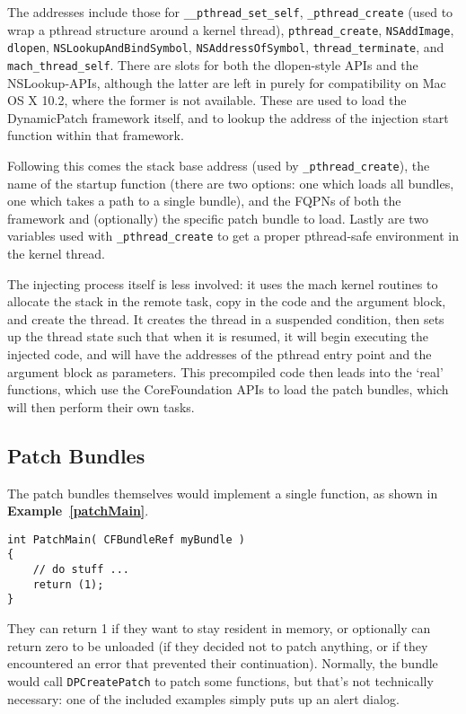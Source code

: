 \documentclass[english]{article}
\begin{document}
The addresses include those for \texttt{\_\_pthread\_set\_self}, \texttt{\_pthread\_create} (used to wrap a pthread structure around a kernel thread), \texttt{pthread\_create}, \texttt{NSAddImage}, \texttt{dlopen}, \texttt{NSLookupAndBindSymbol}, \texttt{NSAddressOfSymbol}, \texttt{thread\_terminate}, and \texttt{mach\_thread\_self}. There are slots for both the dlopen-style APIs and the NSLookup-APIs, although the latter are left in purely for compatibility on Mac OS X 10.2, where the former is not available. These are used to load the DynamicPatch framework itself, and to lookup the address of the injection start function within that framework.

Following this comes the stack base address (used by \texttt{\_pthread\_create}), the name of the startup function (there are two options: one which loads all bundles, one which takes a path to a single bundle), and the FQPNs of both the framework and (optionally) the specific patch bundle to load. Lastly are two variables used with \texttt{\_pthread\_create} to get a proper pthread-safe environment in the kernel thread.

The injecting process itself is less involved: it uses the mach kernel routines to allocate the stack in the remote task, copy in the code and the argument block, and create the thread. It creates the thread in a suspended condition, then sets up the thread state such that when it is resumed, it will begin executing the injected code, and will have the addresses of the pthread entry point and the argument block as parameters. This precompiled code then leads into the `real' functions, which use the CoreFoundation APIs to load the patch bundles, which will then perform their own tasks.

\subsection{Patch Bundles}
The patch bundles themselves would implement a single function, as shown in \textbf{Example~\ref{patchMain}}.

\begin{lstlisting}[label= patchMain, caption=Patch bundle native entry code.]
int PatchMain( CFBundleRef myBundle )
{
	// do stuff ...
	return (1);
}
\end{lstlisting}

They can return 1 if they want to stay resident in memory, or optionally can return zero to be unloaded (if they decided not to patch anything, or if they encountered an error that prevented their continuation). Normally, the bundle would call \texttt{DPCreatePatch} to patch some functions, but that's not technically necessary: one of the included examples simply puts up an alert dialog.
\end{document}
